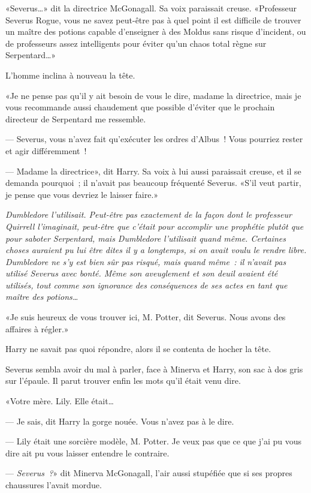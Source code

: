 «Severus…» dit la directrice McGonagall. Sa voix paraissait creuse. «Professeur Severus Rogue, vous ne savez peut-être pas à quel point il est difficile de trouver un maître des potions capable d'enseigner à des Moldus sans risque d'incident, ou de professeurs assez intelligents pour éviter qu'un chaos total règne sur Serpentard…»

L'homme inclina à nouveau la tête.

«Je ne pense pas qu'il y ait besoin de vous le dire, madame la directrice, mais je vous recommande aussi chaudement que possible d'éviter que le prochain directeur de Serpentard me ressemble.

--- Severus, vous n'avez fait qu'exécuter les ordres d'Albus~! Vous pourriez rester et agir différemment~!

--- Madame la directrice», dit Harry. Sa voix à lui aussi paraissait creuse, et il se demanda pourquoi~; il n'avait pas beaucoup fréquenté Severus. «S'il veut partir, je pense que vous devriez le laisser faire.»

\emph{Dumbledore l'utilisait. Peut-être pas exactement de la façon dont le professeur Quirrell l'imaginait, peut-être que c'était pour accomplir une prophétie plutôt que pour saboter Serpentard, mais Dumbledore l'utilisait quand même. Certaines choses auraient pu lui être dites il y a longtemps, si on avait voulu le rendre libre. Dumbledore ne s'y est bien sûr pas risqué, mais quand même~: il n'avait pas utilisé Severus avec bonté. Même son aveuglement et son deuil avaient été utilisés, tout comme son ignorance des conséquences de ses actes en tant que maître des potions…}

«Je suis heureux de vous trouver ici, M. Potter, dit Severus. Nous avons des affaires à régler.»

Harry ne savait pas quoi répondre, alors il se contenta de hocher la tête.

Severus sembla avoir du mal à parler, face à Minerva et Harry, son sac à dos gris sur l'épaule. Il parut trouver enfin les mots qu'il était venu dire.

«Votre mère. Lily. Elle était…

--- Je sais, dit Harry la gorge nouée. Vous n'avez pas à le dire.

--- Lily était une sorcière modèle, M. Potter. Je veux pas que ce que j'ai pu vous dire ait pu vous laisser entendre le contraire.

--- \emph{Severus~?}» dit Minerva McGonagall, l'air aussi stupéfiée que si ses propres chaussures l'avait mordue.

